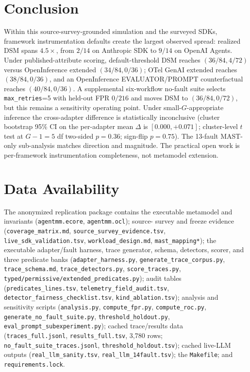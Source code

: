 \documentclass[a4paper,UKenglish,cleveref,autoref,thm-restate]{lipics-v2021}
\begin{document}
\section{Conclusion}
\label{sec:conclusion}

Within this source-survey-grounded simulation and the surveyed SDKs,
framework instrumentation defaults create the largest observed spread:
realized DSM spans $4.5\times$, from $2/14$ on Anthropic SDK to
$9/14$ on OpenAI Agents. Under published-attribute scoring,
default-threshold DSM reaches $(36/84, 4/72)$ versus OpenInference
extended $(34/84, 0/36)$; OTel GenAI extended reaches $(38/84, 0/36)$,
and an OpenInference EVALUATOR/PROMPT counterfactual reaches
$(40/84, 0/36)$. A supplemental six-workflow no-fault suite selects
\texttt{max\_retries}=5 with held-out FPR $0/216$ and moves DSM to
$(36/84, 0/72)$, but this remains a sensitivity operating point.
Under
small-$G$-appropriate inference the cross-adapter difference is
statistically inconclusive (cluster bootstrap 95\% CI on the
per-adapter mean $\Delta$ is $[0.000, +0.071]$; cluster-level $t$ test at $G - 1
= 5$ df two-sided $p = 0.36$; sign-flip $p = 0.75$). The 13-fault
MAST-only sub-analysis matches direction and magnitude. The
practical open work is per-framework instrumentation completeness,
not metamodel extension.

\newpage
\section{Data Availability}
\label{sec:data}

\begin{sloppypar}
The anonymized replication package contains the executable metamodel
and invariants (\texttt{agentmm.ecore}, \texttt{agentmm.ocl}); source-
survey and freeze evidence (\texttt{coverage\_matrix.md},
\texttt{source\_survey\_evidence.tsv}, \texttt{live\_sdk\_validation.tsv},
\texttt{workload\_design.md}, \texttt{mast\_mapping*}); the executable
adapter/fault harness, trace generator, schema, detectors, scorer, and
three predicate banks (\texttt{adapter\_harness.py},
\texttt{generate\_trace\_corpus.py}, \texttt{trace\_schema.md},
\texttt{trace\_detectors.py}, \texttt{score\_traces.py},
\texttt{typed/permissive/extended\_predicates.py}); audit tables
(\texttt{predicates\_lines.tsv}, \texttt{telemetry\_field\_audit.tsv},
\texttt{detector\_fairness\_checklist.tsv}, \texttt{kind\_ablation.tsv});
analysis and sensitivity scripts (\texttt{analysis.py},
\texttt{compute\_fpr.py}, \texttt{compute\_roc.py},
\texttt{generate\_no\_fault\_suite.py}, \texttt{threshold\_holdout.py},
\texttt{eval\_prompt\_subexperiment.py}); cached trace/results data
(\texttt{traces\_full.jsonl}, \texttt{results\_full.tsv}, 3{,}780
rows; \texttt{no\_fault\_suite\_traces.jsonl},
\texttt{threshold\_holdout.tsv}); cached live-LLM outputs (\texttt{real\_llm\_sanity.tsv},
\texttt{real\_llm\_14fault.tsv}); the \texttt{Makefile}; and
\texttt{requirements.lock}.
\end{sloppypar}
\end{document}
